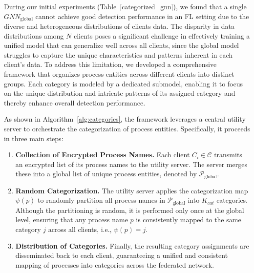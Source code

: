 During our initial experiments (Table~\ref{categorized_gnn}), we found that a single \( {GNN}_{\text{global}} \) cannot achieve good detection performance in an FL setting due to the diverse and heterogeneous distributions of clients data. The disparity in data distributions among \( N \) clients poses a significant challenge in effectively training a unified model that can generalize well across all clients, since the global model struggles to capture the unique characteristics and patterns inherent in each client's data. To address this limitation, we developed a comprehensive framework that organizes process entities across different clients into distinct groups. Each category is modeled by a dedicated submodel, enabling it to focus on the unique distribution and intricate patterns of its assigned category and thereby enhance overall detection performance.

As shown in Algorithm~\ref{alg:categories}, the framework leverages a central utility server to orchestrate the categorization of process entities. Specifically, it proceeds in three main steps:
\begin{enumerate}[itemsep=0.1em, parsep=0em, topsep=0em, leftmargin=*]
    \item \textbf{Collection of Encrypted Process Names.} Each client \(C_i \in \mathcal{C}\) transmits an encrypted list of its process names to the utility server. The server merges these into a global list of unique process entities, denoted by \( \mathcal{P}_{\text{global}} \).

    \item \textbf{Random Categorization.} The utility server applies the categorization map \( \psi(p) \) to randomly partition all process names in \( \mathcal{P}_{\text{global}} \) into \( K_{cat} \) categories. Although the partitioning is random, it is performed only once at the global level, ensuring that any process name \( p \) is consistently mapped to the same category \( j \) across all clients, i.e., \( \psi(p) = j \).

    \item \textbf{Distribution of Categories.} Finally, the resulting category assignments are disseminated back to each client, guaranteeing a unified and consistent mapping of processes into categories across the federated network.
\end{enumerate}



